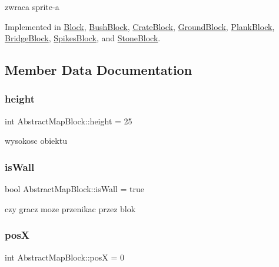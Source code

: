 zwraca sprite-\/a 

Implemented in \hyperlink{class_block_acd9b061af3ad9e79cf49bf9d4dc3d8b9}{Block}, \hyperlink{class_bush_block_ac6346ab038665e207134bb68ab3f20a1}{Bush\+Block}, \hyperlink{class_crate_block_a1f478270194247d4e1f7f4b5eb883be9}{Crate\+Block}, \hyperlink{class_ground_block_a73c0f8ff59ef53b18f03bc3f22f8f810}{Ground\+Block}, \hyperlink{class_plank_block_abada589bb200fd82fcfe00482ad6a32f}{Plank\+Block}, \hyperlink{class_bridge_block_a6ea5fa76b21c9805702c7f214e661198}{Bridge\+Block}, \hyperlink{class_spikes_block_a01ee14c5a7053180abfc6620fbe1e3cd}{Spikes\+Block}, and \hyperlink{class_stone_block_aa2e4adb1d50d9f326ffe427bcdd6d7bb}{Stone\+Block}.



\subsection{Member Data Documentation}
\mbox{\label{class_abstract_map_block_ac20fe00ed32681d06378dd62e5901092}} 
\subsubsection{\texorpdfstring{height}{height}}
{\footnotesize\ttfamily int Abstract\+Map\+Block\+::height = 25}

wysokosc obiektu \mbox{\label{class_abstract_map_block_ae4151be3ea8a899aa9423e57262ef93e}} 
\subsubsection{\texorpdfstring{is\+Wall}{isWall}}
{\footnotesize\ttfamily bool Abstract\+Map\+Block\+::is\+Wall = true}

czy gracz moze przenikac przez blok \mbox{\label{class_abstract_map_block_a5aa7d9d05727ac3b0f0f4746813d77e7}} 
\subsubsection{\texorpdfstring{posX}{posX}}
{\footnotesize\ttfamily int Abstract\+Map\+Block\+::posX = 0}

